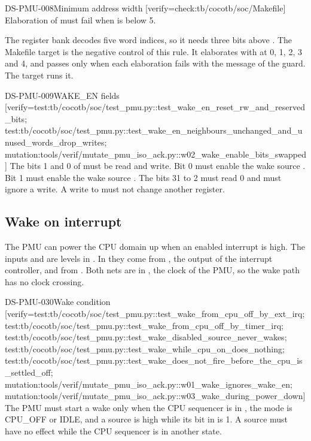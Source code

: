 \begin{requirement}{DS-PMU-008}{Minimum address width}
[verify={check:tb/cocotb/soc/Makefile}]
Elaboration of  must fail when  is below 5.
\end{requirement}
\begin{information}
The register bank decodes five word indices, so it needs three bits above . The Makefile target  is the negative control of this rule. It elaborates  with  at 0, 1, 2, 3 and 4, and passes only when each elaboration fails with the message of the guard. The target  runs it.
\end{information}

\begin{requirement}{DS-PMU-009}{WAKE\_EN fields}
[verify={test:tb/cocotb/soc/test_pmu.py::test_wake_en_reset_rw_and_reserved_bits; test:tb/cocotb/soc/test_pmu.py::test_wake_en_neighbours_unchanged_and_unused_words_drop_writes; mutation:tools/verif/mutate_pmu_iso_ack.py::w02_wake_enable_bits_swapped}]
The bits 1 and 0 of  must be read and write. Bit 0 must enable the wake source . Bit 1 must enable the wake source . The bits 31 to 2 must read 0 and must ignore a write. A write to  must not change another register.
\end{requirement}

\subsection{Wake on interrupt}\label{ds:mod:pmu:wake}
The PMU can power the CPU domain up when an enabled interrupt is high. The inputs  and  are levels in . In  they come from , the output of the interrupt controller, and from . Both nets are in , the clock of the PMU, so the wake path has no clock crossing.

\begin{requirement}{DS-PMU-030}{Wake condition}
[verify={test:tb/cocotb/soc/test_pmu.py::test_wake_from_cpu_off_by_ext_irq; test:tb/cocotb/soc/test_pmu.py::test_wake_from_cpu_off_by_timer_irq; test:tb/cocotb/soc/test_pmu.py::test_wake_disabled_source_never_wakes; test:tb/cocotb/soc/test_pmu.py::test_wake_while_cpu_on_does_nothing; test:tb/cocotb/soc/test_pmu.py::test_wake_does_not_fire_before_the_cpu_is_settled_off; mutation:tools/verif/mutate_pmu_iso_ack.py::w01_wake_ignores_wake_en; mutation:tools/verif/mutate_pmu_iso_ack.py::w03_wake_during_power_down}]
The PMU must start a wake only when the CPU sequencer is in , the mode is CPU\_OFF or IDLE, and a source is high while its bit in  is 1. A source must have no effect while the CPU sequencer is in another state.
\end{requirement}

